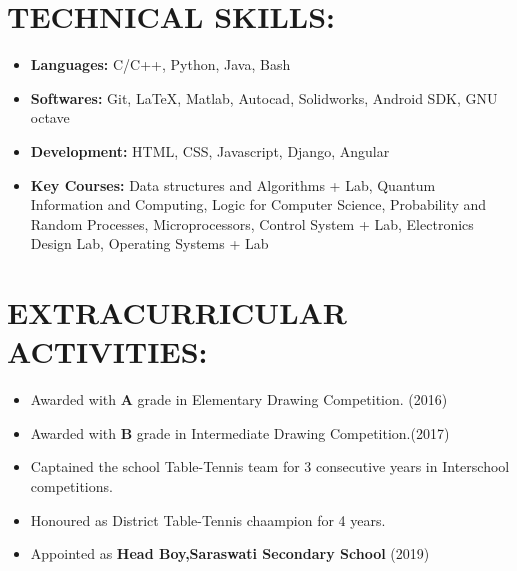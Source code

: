 \documentclass{article}
\begin{document}

\section*{\color{blue!60!black}TECHNICAL SKILLS:}


\begin{itemize}
    \item \textbf{Languages: }C/C++, Python, Java, Bash
    \item \textbf{Softwares: }Git, \LaTeX{}, Matlab, Autocad, Solidworks, Android SDK, GNU octave
    \item \textbf{Development: }HTML, CSS, Javascript, Django, Angular
    \item \textbf{Key Courses: }Data structures and Algorithms + Lab, Quantum Information and Computing, Logic for Computer Science, Probability and Random Processes, Microprocessors, Control System + Lab, Electronics Design Lab, Operating Systems + Lab
\end{itemize}


\section*{\color{blue!60!black}EXTRACURRICULAR ACTIVITIES:}

\begin{itemize}
    \item Awarded with \textbf{A} grade in Elementary Drawing Competition. \hfill{(2016)}
    \item Awarded with \textbf{B} grade in Intermediate Drawing Competition.\hfill{(2017)}
    \item Captained the school Table-Tennis team for 3 consecutive years in Interschool competitions.
    \item Honoured as District Table-Tennis chaampion for 4 years.
    \item Appointed as \textbf{Head Boy,Saraswati Secondary School} \hfill{(2019)}
\end{itemize}

\end{document}
